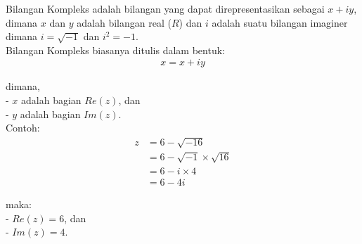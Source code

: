 \documentclass{article}
\begin{document}
    Bilangan Kompleks adalah bilangan yang dapat direpresentasikan sebagai \( x + iy \), dimana $x$ dan $y$ adalah bilangan real ($R$) dan $i$ adalah suatu bilangan imaginer dimana \( i = \sqrt{-1} \) dan \( i^2 = -1 \).\\

    Bilangan Kompleks biasanya ditulis dalam bentuk:
    \begin{align}
        x = x + iy
    \end{align}

    \>dimana,\\
    - $x$ adalah bagian $Re(z)$, dan\\
    - $y$ adalah bagian $Im(z)$.\\

    Contoh:
    \begin{align}
        z & = 6 - \sqrt{-16} 
        \nonumber\\
        & = 6 - \sqrt{-1} \times \sqrt{16}
        \nonumber\\
        & = 6 - i \times 4
        \nonumber\\
        & = 6 - 4i
    \end{align}

    maka:\\
    -   $Re(z) = 6$, dan\\
    -   $Im(z) = 4$.\\
\end{document}
